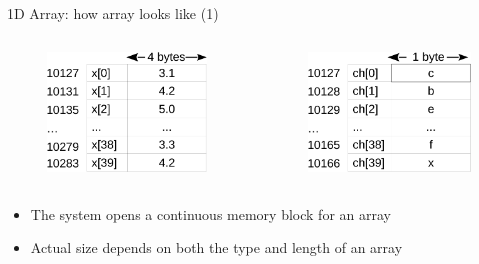 \begin{frame}[fragile]{1D Array: how array looks like (1)}
\begin{columns}
\begin{column}{0.5\linewidth}
\begin{figure}
	\includegraphics[width=0.88\linewidth]{figs/farray.pdf}
\end{figure}
\end{column}
\begin{column}{0.5\linewidth}
\begin{figure}
	\includegraphics[width=0.9\linewidth]{figs/charray.pdf}
\end{figure}
\end{column}
\end{columns}
\vspace{0.1in}
\begin{itemize}
	\item {The system opens a continuous memory block for an array}
	\item {Actual size depends on both the type and length of an array}
\end{itemize}
\end{frame}


